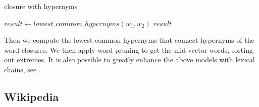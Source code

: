     \begin{algorithm}[H]
    \begin{algorithmic}[1]
      \caption{\wordnet{} closure with hypernyms}\label{wordnet}
          \State $result \gets lowest\_common\_hypernyms(w_1, w_2)$
        \EndFor
      \EndFor
      \State \Return $result$
    \end{algorithmic}
    \end{algorithm}

  Then we compute the lowest common hypernyms that connect hypernyms of the word closures. We then apply word pruning to get the mid vector words, sorting out extremes. It is also possible to greatly enhance the above models with lexical chains, see \cite{SemanticClusteringWithWordnet}.

  \subsection{Wikipedia}
  \label{sec:wikpedia}
    

